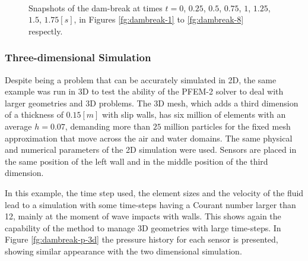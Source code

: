\documentclass[a4paper,conference]{IEEEtran}
\begin{document}
\begin{figure}
{    } \\
   \caption{Snapshots of the dam-break at times $t=0$, $0.25$, $0.5$, $0.75$, $1$, $1.25$, $1.5$, $1.75[s]$, in Figures \ref{fg:dambreak-1} to \ref{fg:dambreak-8} respectly.}
   \label{fg:dambreak-screenshots}
\end{figure}
\clearpage

\subsubsection{Three-dimensional Simulation}\label{sec:ETSIN-3d}

Despite being a problem that can be accurately simulated in 2D, the same example was run in 3D to test the ability of the PFEM-2 solver to deal with larger geometries and 3D problems. The 3D mesh, which adds a third dimension of a thickness of $0.15[m]$ with slip walls, has six million of elements with an average $h=0.07$, demanding more than $25$ million particles for the fixed mesh approximation that move across the air and water domains. The same physical and numerical parameters of the 2D simulation were used. Sensors are placed in the same position of the left wall and in the middle position of the third dimension.

In this example, the time step used, the element sizes and the velocity of the fluid lead to a simulation with some time-steps having a Courant number larger than 12, mainly at the moment of wave impacts with walls. This shows again the capability of the method to manage 3D geometries with large time-steps. In Figure \ref{fg:dambreak-p-3d} the pressure history for each sensor is presented, showing similar appearance with the two dimensional simulation.
\end{document}
